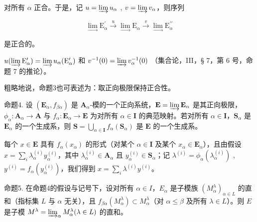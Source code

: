 对所有 \(\alpha\) 正合。于是，记 \(u = \varinjlim u_{\alpha}\) , \(v = \varinjlim v_{\alpha}\)，则序列

\[
\lim _ {\longrightarrow} \mathrm{E} _ {\alpha} ^ {\prime} \xrightarrow {u} \lim _ {\longrightarrow} \mathrm{E} _ {\alpha} \xrightarrow {v} \lim _ {\longrightarrow} \mathrm{E} _ {\alpha} ^ {\prime \prime}
\]

是正合的。

\(u(\varinjlim \mathrm{E}_{\alpha}^{\prime}) = \varinjlim u_{\alpha}(\mathrm{E}_{\alpha}^{\prime})\) 和 \(v^{-1}(0) = \varinjlim v_{\alpha}^{-1}(0)\) （集合论，III，§ 7，第 6 号，命题 7 的推论）。

粗略地说，命题3也可表述为：取正向极限保持正合性。

命题4. 设 \((\mathbf{E}_{\alpha}, f_{\beta \alpha})\) 是 \(\mathbf{A}_{\alpha}\)-模的一个正向系统，\(\mathbf{E} = \varinjlim \mathbf{E}_{\alpha}\) 是其正向极限，\(\phi_{\alpha}: \mathbf{A}_{\alpha} \to \mathbf{A}\) 与 \(f_{\alpha}: \mathbf{E}_{\alpha} \to \mathbf{E}\) 为对所有 \(\alpha \in \mathbf{I}\) 的典范映射。若对所有 \(\alpha \in \mathbf{I}\)，\(\mathbf{S}_{\alpha}\) 是 \(\mathbf{E}_{\alpha}\) 的一个生成系，则 \(\mathbf{S} = \bigcup_{\alpha \in \mathbf{I}} f_{\alpha}(\mathbf{S}_{\alpha})\) 是 \(\mathbf{E}\) 的一个生成系。

每个 \(x \in \mathbf{E}\) 具有 \(f_{\alpha}(x_{\alpha})\) 的形式（对某个 \(\alpha \in \mathbf{I}\) 及某个 \(x_{\alpha} \in \mathbf{E}_{\alpha}\)），且由假设 \(x = \sum_{i} \lambda_{\alpha}^{(i)} y_{\alpha}^{(i)}\)，其中 \(\lambda_{\alpha}^{(i)} \in \mathbf{A}_{\alpha}\) 且 \(y_{\alpha}^{(i)} \in \mathbf{S}_{\alpha}\)；记 \(\lambda^{(i)} = \phi_{\alpha}(\lambda_{\alpha}^{(i)})\) , \(y^{(i)} = f_{\alpha}(y_{\alpha}^{(i)})\)，我们得到 \(x = \sum_{i} \lambda^{(i)} y^{(i)}\)。

命题5. 在命题4的假设与记号下，设对所有 \(\alpha \in I\)，\(E_{\alpha}\) 是子模族 \((M_{\alpha}^{\lambda})_{\alpha \in L}\) 的直和（指标集 \(L\) 与 \(\alpha\) 无关），且 \(f_{\beta \alpha}(M_{\alpha}^{\lambda}) \subset M_{\alpha}^{\lambda}\)（对 \(\alpha \leqslant \beta\) 及所有 \(\lambda \in L\)）。则 \(E\) 是子模 \(M^{\lambda} = \varinjlim_{\alpha} M_{\alpha}^{\lambda} (\lambda \in L)\) 的直和。

